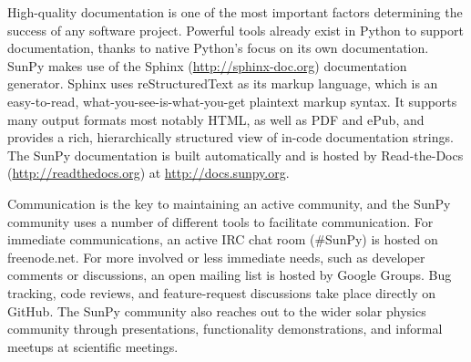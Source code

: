 High-quality documentation is
one of the most important factors determining the success of any software project. 
Powerful tools already exist in Python to support documentation, thanks to native
Python's focus on its own documentation. SunPy makes use of the Sphinx (\url{http://sphinx-doc.org})
documentation generator. Sphinx uses reStructuredText as its markup language, which is
an easy-to-read, what-you-see-is-what-you-get plaintext markup syntax. It supports
many output formats most notably HTML, as well as PDF and ePub, and provides a rich,
hierarchically structured view of in-code documentation strings. The SunPy documentation 
is built automatically and is hosted by Read-the-Docs (\url{http://readthedocs.org})
at \url{http://docs.sunpy.org}. 

Communication is the key to maintaining an active community, and the SunPy community 
uses a number of different tools to facilitate communication. For immediate communications, an active IRC chat
room (\#SunPy) is hosted on freenode.net. For more involved or less immediate needs, such as
developer comments or discussions, an open mailing list is hosted by Google Groups. 
Bug tracking, code reviews, and feature-request discussions take place directly on GitHub.
The SunPy community also reaches out to the wider solar physics
community through presentations, functionality demonstrations, and informal meetups at scientific
meetings. 